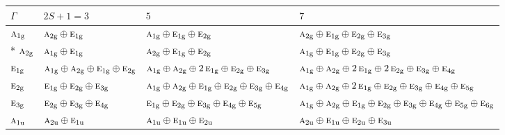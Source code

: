 \documentclass[10pt,a4paper]{article}
\numberwithin{equation}{section}
\newcommand{\irr}[1]{\text{\normalfont\scshape #1}}
\newcommand{\ptag}[1]{\mathrm{#1}}
\begin{document}
{\small\setlength{\tabcolsep}{3pt}\begin{longtable}{@{}l>{\RaggedRight\arraybackslash}p{}>{\RaggedRight\arraybackslash}p{}>{\RaggedRight\arraybackslash}p{}@{}}\toprule
$\Gamma$ & $2S + 1 = 3$ & $5$ & $7$\\\midrule\endhead
\bottomrule\endfoot\endlastfoot
$\irr{a}_{1\ptag{g}}$ & $\irr{a}_{2\ptag{g}}\oplus \irr{e}_{1\ptag{g}}$ & $\irr{a}_{1\ptag{g}}\oplus \irr{e}_{1\ptag{g}}\oplus \irr{e}_{2\ptag{g}}$ & $\irr{a}_{2\ptag{g}}\oplus \irr{e}_{1\ptag{g}}\oplus \irr{e}_{2\ptag{g}}\oplus \irr{e}_{3\ptag{g}}$\\*
$\irr{a}_{2\ptag{g}}$ & $\irr{a}_{1\ptag{g}}\oplus \irr{e}_{1\ptag{g}}$ & $\irr{a}_{2\ptag{g}}\oplus \irr{e}_{1\ptag{g}}\oplus \irr{e}_{2\ptag{g}}$ & $\irr{a}_{1\ptag{g}}\oplus \irr{e}_{1\ptag{g}}\oplus \irr{e}_{2\ptag{g}}\oplus \irr{e}_{3\ptag{g}}$\\
$\irr{e}_{1\ptag{g}}$ & $\irr{a}_{1\ptag{g}}\oplus \irr{a}_{2\ptag{g}}\oplus \irr{e}_{1\ptag{g}}\oplus \irr{e}_{2\ptag{g}}$ & $\irr{a}_{1\ptag{g}}\oplus \irr{a}_{2\ptag{g}}\oplus 2\,\irr{e}_{1\ptag{g}}\oplus \irr{e}_{2\ptag{g}}\oplus \irr{e}_{3\ptag{g}}$ & $\irr{a}_{1\ptag{g}}\oplus \irr{a}_{2\ptag{g}}\oplus 2\,\irr{e}_{1\ptag{g}}\oplus 2\,\irr{e}_{2\ptag{g}}\oplus \irr{e}_{3\ptag{g}}\oplus \irr{e}_{4\ptag{g}}$\\
$\irr{e}_{2\ptag{g}}$ & $\irr{e}_{1\ptag{g}}\oplus \irr{e}_{2\ptag{g}}\oplus \irr{e}_{3\ptag{g}}$ & $\irr{a}_{1\ptag{g}}\oplus \irr{a}_{2\ptag{g}}\oplus \irr{e}_{1\ptag{g}}\oplus \irr{e}_{2\ptag{g}}\oplus \irr{e}_{3\ptag{g}}\oplus \irr{e}_{4\ptag{g}}$ & $\irr{a}_{1\ptag{g}}\oplus \irr{a}_{2\ptag{g}}\oplus 2\,\irr{e}_{1\ptag{g}}\oplus \irr{e}_{2\ptag{g}}\oplus \irr{e}_{3\ptag{g}}\oplus \irr{e}_{4\ptag{g}}\oplus \irr{e}_{5\ptag{g}}$\\
$\irr{e}_{3\ptag{g}}$ & $\irr{e}_{2\ptag{g}}\oplus \irr{e}_{3\ptag{g}}\oplus \irr{e}_{4\ptag{g}}$ & $\irr{e}_{1\ptag{g}}\oplus \irr{e}_{2\ptag{g}}\oplus \irr{e}_{3\ptag{g}}\oplus \irr{e}_{4\ptag{g}}\oplus \irr{e}_{5\ptag{g}}$ & $\irr{a}_{1\ptag{g}}\oplus \irr{a}_{2\ptag{g}}\oplus \irr{e}_{1\ptag{g}}\oplus \irr{e}_{2\ptag{g}}\oplus \irr{e}_{3\ptag{g}}\oplus \irr{e}_{4\ptag{g}}\oplus \irr{e}_{5\ptag{g}}\oplus \irr{e}_{6\ptag{g}}$\\
$\irr{a}_{1\ptag{u}}$ & $\irr{a}_{2\ptag{u}}\oplus \irr{e}_{1\ptag{u}}$ & $\irr{a}_{1\ptag{u}}\oplus \irr{e}_{1\ptag{u}}\oplus \irr{e}_{2\ptag{u}}$ & $\irr{a}_{2\ptag{u}}\oplus \irr{e}_{1\ptag{u}}\oplus \irr{e}_{2\ptag{u}}\oplus \irr{e}_{3\ptag{u}}$\\

\end{longtable}}
\end{document}

